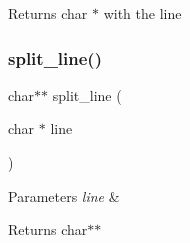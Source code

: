 \begin{DoxyReturn}{Returns}
char $\ast$ with the line 
\end{DoxyReturn}
\mbox{\label{prompt_8c_a0fa6791564b78ce51a5c31ddd923b892}} 
\subsubsection{split\+\_\+line()}
{\footnotesize\ttfamily char$\ast$$\ast$ split\+\_\+line (\begin{DoxyParamCaption}\item[{char $\ast$}]{line }\end{DoxyParamCaption})}


\begin{DoxyParams}{Parameters}
{\em line} & \\
\hline
\end{DoxyParams}
\begin{DoxyReturn}{Returns}
char$\ast$$\ast$ 
\end{DoxyReturn}
